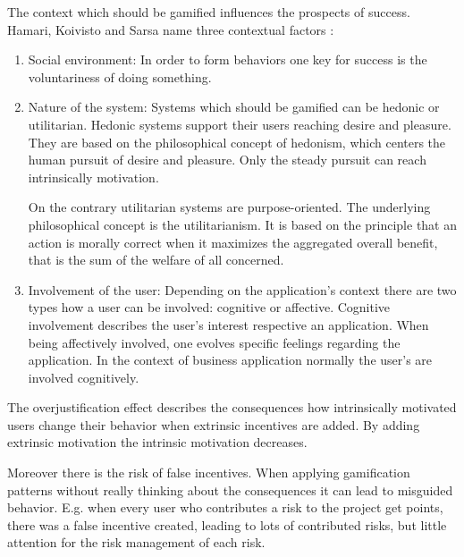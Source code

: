 The context which should be gamified influences the prospects of success.  Hamari, Koivisto and Sarsa name three contextual factors \cite[p. 3029, 3030]{hamariDoesGamificationWork2014}:
\begin{enumerate}
	\item Social environment: \newline
	In order to form behaviors  one key for success is the voluntariness of doing something. \cite[p. 3030]{hamariDoesGamificationWork2014}
		
	\item Nature of the system: \newline
	Systems which should be gamified can be hedonic or utilitarian. Hedonic systems support their users reaching desire and pleasure. \cite[p. 3030]{hamariDoesGamificationWork2014}
	They are based on the philosophical concept of hedonism, which centers the human pursuit of desire and pleasure. Only the steady pursuit can reach intrinsically motivation. \cite[p. LV ]{mueller-saloHenrySidgwickUtilitarismus2019}
		
	On the contrary utilitarian systems are purpose-oriented. The underlying philosophical concept is the utilitarianism. It is based on the principle that an action is morally correct when it maximizes the aggregated overall benefit, that is the sum of the welfare of all concerned. \cite[p. 3 ]{mueller-saloHenrySidgwickUtilitarismus2019}
		
	\item Involvement of the user: \newline
	Depending on the application's context there are two types how a user can be involved: cognitive or affective. \cite[p. 3030]{hamariDoesGamificationWork2014} Cognitive involvement describes the user's interest respective an application. When being affectively involved, one evolves specific feelings regarding the application. In the context of business application normally the user's are involved cognitively. \cite{zaichkowskyPersonalInvolvementInventory2013}
\end{enumerate}

The overjustification effect describes the consequences how intrinsically motivated users change their behavior when extrinsic incentives are added. By adding extrinsic motivation the intrinsic motivation decreases. \cite[p. 9-13]{bierhoffeditorEnzyklopaediePsychologieSoziale2016}
	
Moreover there is the risk of false incentives. When applying gamification patterns without really thinking about the consequences it can lead to misguided behavior. E.g. when every user who contributes a risk to the project get points, there was a false incentive created, leading to lots of contributed risks, but little attention for the risk management of each risk. \cite[p.69]{kumarGamificationWorkDesigning2013}
 
